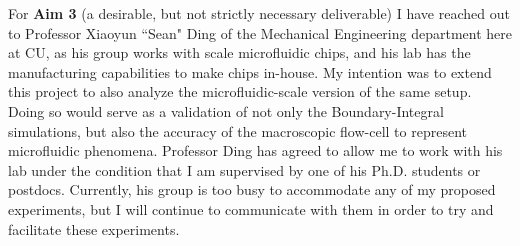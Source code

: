 \documentclass{article}
\begin{document}
For \textbf{Aim 3} (a desirable, but not strictly necessary deliverable) I have reached out to Professor Xiaoyun ``Sean" Ding of the Mechanical Engineering department here at CU, as his group works with scale microfluidic chips, and his lab has the manufacturing capabilities to make chips in-house. My intention was to extend this project to also analyze the microfluidic-scale version of the same setup. Doing so would serve as a validation of not only the Boundary-Integral simulations, but also the accuracy of the macroscopic flow-cell to represent microfluidic phenomena. Professor Ding has agreed to allow me to work with his lab under the condition that I am supervised by one of his Ph.D. students or postdocs. Currently, his group is too busy to accommodate any of my proposed experiments, but I will continue to communicate with them in order to try and facilitate these experiments.

\printbibliography
\end{document}
